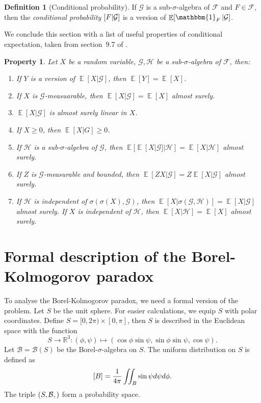 \documentclass[twoside,a4paper]{report}
\theoremstyle{plain}
\newtheorem{property}[theorem]{Property}
\theoremstyle{definition}
\newtheorem{definition}[theorem]{Definition}
\theoremstyle{remark}
\numberwithin{equation}{chapter}
\newcommand{\R}{\mathbb{R}}
\let\P\relax
\DeclareMathOperator{\P}{\mathbb{P}}
\DeclareMathOperator{\E}{\mathbb{E}}
\DeclareMathOperator{\1}{\mathbbm{1}}
\newcommand{\F}{\mathcal{F}}
\renewcommand{\G}{\mathcal{G}}
\renewcommand{\H}{\mathcal{H}}
\newcommand{\B}{\mathcal{B}}
\begin{document}
\begin{definition}[Conditional probability]
If $\G$ is a sub-$\sigma$-algebra of $\F$ and $F\in\F$, then the \emph{conditional probability} $\P[F|\G]$ is a version of $\E[\1_F|\G]$.
\end{definition}

We conclude this section with a list of useful properties of conditional expectation, taken from section~9.7 of \cite{Williams91}.

\begin{property}\label{property:expcon}
Let $X$ be a random variable, $\G,\H$ be a sub-$\sigma$-algebra of $\F$, then:
\begin{enumerate}
\item If $Y$ is a version of $\E[X|\G]$, then $\E[Y]=\E[X]$.
\item If $X$ is $\G$-measuarable, then $\E[X|\G]=\E[X]$ almost surely.
\item $\E[X|\G]$ is almost surely linear in $X$.
\item If $X\geq 0$, then $\E[X|G]\geq 0$.
\item If $\H$ is a sub-$\sigma$-algebra of $\G$, then $\E[\E[X|\G]|\H]=\E[X|\H]$ almost surely.
\item If $Z$ is $\G$-measurable and bounded, then $\E[ZX|\G]=Z\E[X|\G]$ almost surely.
\item If $\H$ is independent of $\sigma(\sigma(X),\G)$, then $\E[X|\sigma(\G,\H)]=\E[X|\G]$ almost surely. If $X$ is independent of $\H$, then $\E[X|\H]=\E[X]$ almost surely.
\end{enumerate}
\end{property}

\section{Formal description of the Borel-Kolmogorov paradox}
To analyse the Borel-Kolmogorov paradox, we need a formal version of the problem. Let $S$ be the unit sphere. For easier calculations, we equip $S$ with polar coordinates. Define $S=[0,2\pi)\times[0,\pi]$, then $S$ is described in the Euclidean space with the function
\begin{equation}\label{eq:BorelPolar}
S\to\R^3:(\phi,\psi)\mapsto(\cos\phi\sin\psi,\sin\phi\sin\psi,\cos\psi).
\end{equation}
Let $\B=\B(S)$ be the Borel-$\sigma$-algebra on $S$. The uniform distribution on $S$ is defined as
\begin{equation}
\P[B]=\frac{1}{4\pi}\iint_B\sin\psi d\psi d\phi.
\end{equation}
The triple $(S,\B,\P)$ form a probability space.
\end{document}
